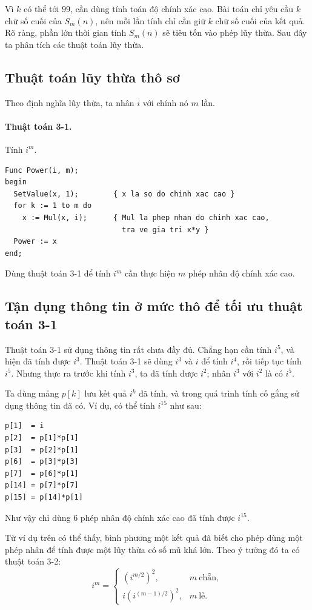 \documentclass[11pt]{article}
\begin{document}
Vì \(k\) có thể tới \(99\), cần dùng tính toán độ chính xác cao. Bài toán chỉ
yêu cầu \(k\) chữ số cuối của \(S_m(n)\), nên mỗi lần tính chỉ cần giữ \(k\)
chữ số cuối của kết quả. Rõ ràng, phần lớn thời gian tính \(S_m(n)\) sẽ tiêu
tốn vào phép lũy thừa. Sau đây ta phân tích các thuật toán lũy thừa.

\subsection{Thuật toán lũy thừa thô sơ}

Theo định nghĩa lũy thừa, ta nhân \(i\) với chính nó \(m\) lần.

\paragraph{Thuật toán 3-1.} Tính \(i^m\).
\begin{verbatim}
Func Power(i, m);
begin
  SetValue(x, 1);        { x la so do chinh xac cao }
  for k := 1 to m do
    x := Mul(x, i);      { Mul la phep nhan do chinh xac cao,
                           tra ve gia tri x*y }
  Power := x
end;
\end{verbatim}

Dùng thuật toán 3-1 để tính \(i^m\) cần thực hiện \(m\) phép nhân độ chính
xác cao.

\subsection{Tận dụng thông tin ở mức thô để tối ưu thuật toán 3-1}

Thuật toán 3-1 sử dụng thông tin rất chưa đầy đủ. Chẳng hạn cần tính \(i^5\),
và hiện đã tính được \(i^3\). Thuật toán 3-1 sẽ dùng \(i^3\) và \(i\) để tính
\(i^4\), rồi tiếp tục tính \(i^5\). Nhưng thực ra trước khi tính \(i^3\), ta
đã tính được \(i^2\); nhân \(i^3\) với \(i^2\) là có \(i^5\).

Ta dùng mảng \(p[k]\) lưu kết quả \(i^k\) đã tính, và trong quá trình tính
cố gắng sử dụng thông tin đã có. Ví dụ, có thể tính \(i^{15}\) như sau:
\begin{verbatim}
p[1]  = i
p[2]  = p[1]*p[1]
p[3]  = p[2]*p[1]
p[6]  = p[3]*p[3]
p[7]  = p[6]*p[1]
p[14] = p[7]*p[7]
p[15] = p[14]*p[1]
\end{verbatim}
Như vậy chỉ dùng \(6\) phép nhân độ chính xác cao đã tính được \(i^{15}\).

Từ ví dụ trên có thể thấy, bình phương một kết quả đã biết cho phép dùng một
phép nhân để tính được một lũy thừa có số mũ khá lớn. Theo ý tưởng đó ta có
thuật toán 3-2:
\[
  i^m =
  \begin{cases}
    \left(i^{m/2}\right)^2, & m\ \text{chẵn},\\
    i\left(i^{(m-1)/2}\right)^2, & m\ \text{lẻ}.
  \end{cases}
\]
\end{document}
